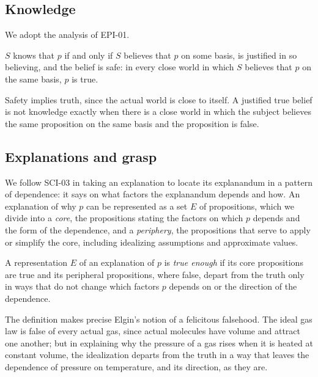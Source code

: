 \documentclass{situationist-preprint}
\begin{document}
\subsection{Knowledge}

We adopt the analysis of EPI-01.

\begin{definition}[Knowledge]\label{d:know}
$S$ knows that $p$ if and only if $S$ believes that $p$ on some basis, is justified in so believing, and the belief is safe: in every close world in which $S$ believes that $p$ on the same basis, $p$ is true.
\end{definition}

Safety implies truth, since the actual world is close to itself. A justified true belief is not knowledge exactly when there is a close world in which the subject believes the same proposition on the same basis and the proposition is false.

\subsection{Explanations and grasp}

We follow SCI-03 in taking an explanation to locate its explanandum in a pattern of dependence: it says on what factors the explanandum depends and how. An explanation of why $p$ can be represented as a set $E$ of propositions, which we divide into a \emph{core}, the propositions stating the factors on which $p$ depends and the form of the dependence, and a \emph{periphery}, the propositions that serve to apply or simplify the core, including idealizing assumptions and approximate values.

\begin{definition}\label{d:trueenough}
A representation $E$ of an explanation of $p$ is \emph{true enough} if its core propositions are true and its peripheral propositions, where false, depart from the truth only in ways that do not change which factors $p$ depends on or the direction of the dependence.
\end{definition}

The definition makes precise Elgin's notion of a felicitous falsehood. The ideal gas law is false of every actual gas, since actual molecules have volume and attract one another; but in explaining why the pressure of a gas rises when it is heated at constant volume, the idealization departs from the truth in a way that leaves the dependence of pressure on temperature, and its direction, as they are.
\end{document}

